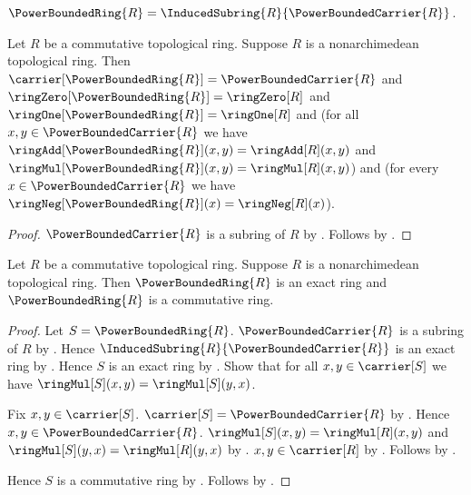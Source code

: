 \begin{definition}\label{power_bounded_ring}
    $\PowerBoundedRing{R}
        =\InducedSubring{R}{\PowerBoundedCarrier{R}}$.
\end{definition}

\begin{theorem}\label{power_bounded_ring_agreement}
    Let $R$ be a commutative topological ring.
    Suppose $R$ is a nonarchimedean topological ring.
    Then $\carrier[\PowerBoundedRing{R}]=\PowerBoundedCarrier{R}$ and
        $\ringZero[\PowerBoundedRing{R}]=\ringZero[R]$ and
        $\ringOne[\PowerBoundedRing{R}]=\ringOne[R]$ and
        (for all $x,y\in\PowerBoundedCarrier{R}$ we have
            $\ringAdd[\PowerBoundedRing{R}](x,y)=\ringAdd[R](x,y)$ and
            $\ringMul[\PowerBoundedRing{R}](x,y)=\ringMul[R](x,y)$) and
        (for every $x\in\PowerBoundedCarrier{R}$ we have
            $\ringNeg[\PowerBoundedRing{R}](x)=\ringNeg[R](x)$).
\end{theorem}
\begin{proof}
    $\PowerBoundedCarrier{R}$ is a subring of $R$ by
        .
    Follows by .
\end{proof}

\begin{theorem}\label{power_bounded_ring_is_exact_commutative_ring}
    Let $R$ be a commutative topological ring.
    Suppose $R$ is a nonarchimedean topological ring.
    Then $\PowerBoundedRing{R}$ is an exact ring and
        $\PowerBoundedRing{R}$ is a commutative ring.
\end{theorem}
\begin{proof}
    Let $S=\PowerBoundedRing{R}$.
    $\PowerBoundedCarrier{R}$ is a subring of $R$ by
        .
    Hence $\InducedSubring{R}{\PowerBoundedCarrier{R}}$ is an exact ring by
        .
    Hence $S$ is an exact ring by .
    Show that for all $x,y\in\carrier[S]$ we have
        $\ringMul[S](x,y)=\ringMul[S](y,x)$.
    \begin{subproof}
        Fix $x,y\in\carrier[S]$.
        $\carrier[S]=\PowerBoundedCarrier{R}$ by
            .
        Hence $x,y\in\PowerBoundedCarrier{R}$.
        $\ringMul[S](x,y)=\ringMul[R](x,y)$ and
            $\ringMul[S](y,x)=\ringMul[R](y,x)$ by
            .
        $x,y\in\carrier[R]$ by
            .
        Follows by .
    \end{subproof}
    Hence $S$ is a commutative ring by .
    Follows by \auto.
\end{proof}

